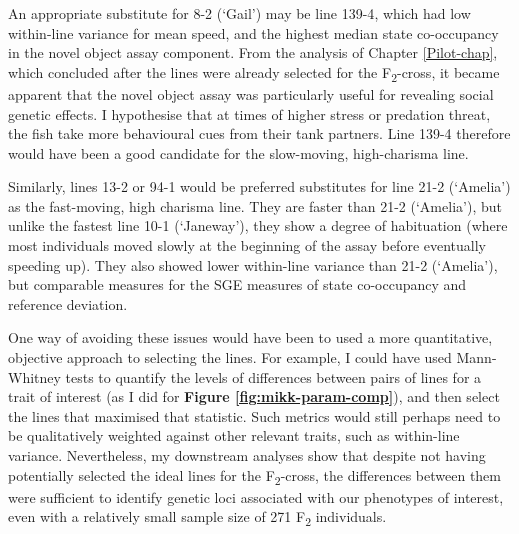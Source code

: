 \documentclass[
]{book}
\begin{document}
An appropriate substitute for \textcolor{8-2 (‘Gail’)_FF699C}{8-2 (‘Gail’)} may be line \textcolor{139-4_FF61CC}{139-4}, which had low within-line variance for mean speed, and the highest median state co-occupancy in the novel object assay component. From the analysis of Chapter \ref{Pilot-chap}, which concluded after the lines were already selected for the F\textsubscript{2}-cross, it became apparent that the novel object assay was particularly useful for revealing social genetic effects. I hypothesise that at times of higher stress or predation threat, the fish take more behavioural cues from their tank partners. Line \textcolor{139-4_FF61CC}{139-4} therefore would have been a good candidate for the slow-moving, high-charisma line.

Similarly, lines \textcolor{13-2_F57A5F}{13-2} or \textcolor{94-1_D39200}{94-1} would be preferred substitutes for line \textcolor{21-2 (‘Amelia’)_49B500}{21-2 (‘Amelia’)} as the fast-moving, high charisma line. They are faster than \textcolor{21-2 (‘Amelia’)_49B500}{21-2 (‘Amelia’)}, but unlike the fastest line \textcolor{10-1 (‘Janeway’)_F8766D}{10-1 (‘Janeway’)}, they show a degree of habituation (where most individuals moved slowly at the beginning of the assay before eventually speeding up). They also showed lower within-line variance than \textcolor{21-2 (‘Amelia’)_49B500}{21-2 (‘Amelia’)}, but comparable measures for the SGE measures of state co-occupancy and reference deviation.

One way of avoiding these issues would have been to used a more quantitative, objective approach to selecting the lines. For example, I could have used Mann-Whitney tests to quantify the levels of differences between pairs of lines for a trait of interest (as I did for \textbf{Figure \ref{fig:mikk-param-comp}}), and then select the lines that maximised that statistic. Such metrics would still perhaps need to be qualitatively weighted against other relevant traits, such as within-line variance. Nevertheless, my downstream analyses show that despite not having potentially selected the ideal lines for the F\textsubscript{2}-cross, the differences between them were sufficient to identify genetic loci associated with our phenotypes of interest, even with a relatively small sample size of 271 F\textsubscript{2} individuals.
\end{document}

